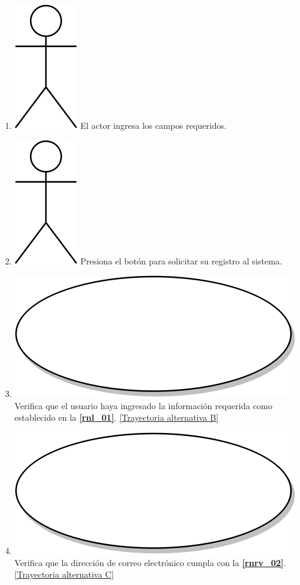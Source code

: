 \begin{enumerate}
  \item {\includegraphics[scale=.1]{Capitulo3/img/actor.png} El actor ingresa los campos requeridos.}
  \item {\includegraphics[scale=.1]{Capitulo3/img/actor.png} Presiona el botón para solicitar su registro al sistema.}
  \item {\includegraphics[scale=.05]{Capitulo3/img/proceso.png} Verifica que el usuario haya ingresado la información requerida como establecido en la \textbf{\ref{rnl_01}}. \hyperref[cu2_ta_b]{[Trayectoria alternativa B]}}
  \item {\includegraphics[scale=.05]{Capitulo3/img/proceso.png} Verifica que la dirección de correo electrónico cumpla con la \textbf{\ref{rnrv_02}}. \hyperref[cu2_ta_c]{[Trayectoria alternativa C]}}

\end{enumerate}
